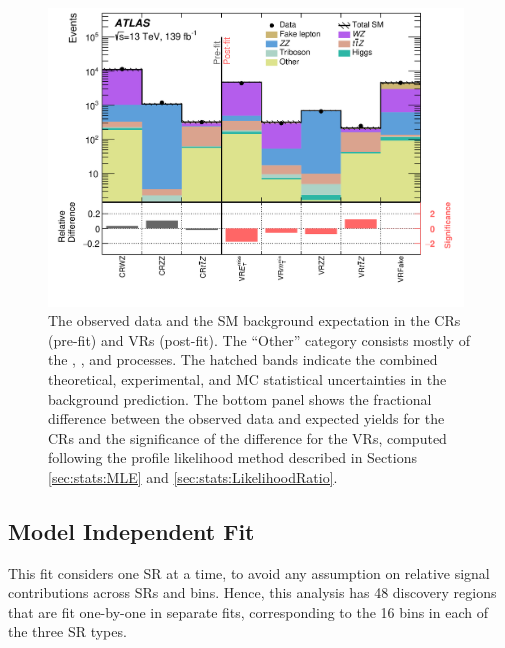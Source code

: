 \begin{figure}[tbp]
  \begin{center}
    \includegraphics[width=0.98\textwidth]{figs/rpvthreel/histpull_all_doSRsInBkg_CRVR.png}
  \end{center}
  \caption[The observed data and the SM background expectation in the CRs (pre-fit) and VRs (post-fit).]
           {The observed data and the SM background expectation in the CRs (pre-fit) and VRs (post-fit). The ``Other'' category consists mostly of the \tWZ, \ttW, and \tZ processes. The hatched bands indicate the combined theoretical, experimental, and MC statistical uncertainties in the background prediction. The bottom panel shows the fractional difference between the observed  data and expected yields for the CRs and the significance of the difference for the VRs, computed following the profile likelihood method described in Sections \ref{sec:stats:MLE} and \ref{sec:stats:LikelihoodRatio}.}
   \label{fig:dataMCagreement_CRVR}
\end{figure}

\subsection{Model Independent Fit}
\label{sec:stats:modind}

This fit considers one SR at a time, to avoid any assumption on relative signal contributions across SRs and \mZl bins.
Hence, this analysis has 48 discovery regions that are fit one-by-one in separate fits, corresponding to the 16 bins in each of the three SR types.

